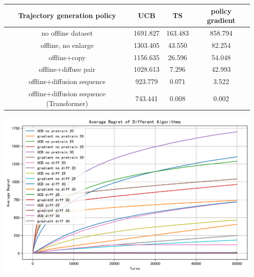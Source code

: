 \begin{center}
\begin{tabular}{cccc}
  \toprule
  Trajectory generation policy & UCB & TS & policy gradient \\
  \midrule
  no offline dataset                           & 1691.827 & 163.483 & 858.794 \\
  offline, no enlarge                          & 1303.405 &  43.550 &  82.254 \\
  offline+copy                                 & 1156.635 &  26.596 &  54.048 \\
  offline+diffuse pair                         & 1028.613 &   7.296 &  42.993 \\
  offline+diffusion sequence                   &  923.779 &   0.071 &   3.522 \\
  offline+diffusion sequence (Transformer)     &  743.441 &   0.008 &   0.002 \\
  \bottomrule
\end{tabular}
\end{center}


\begin{tikzfigure}
    \includegraphics[width=\linewidth]{./Img/stochastic_non_bern.png}
\end{tikzfigure}